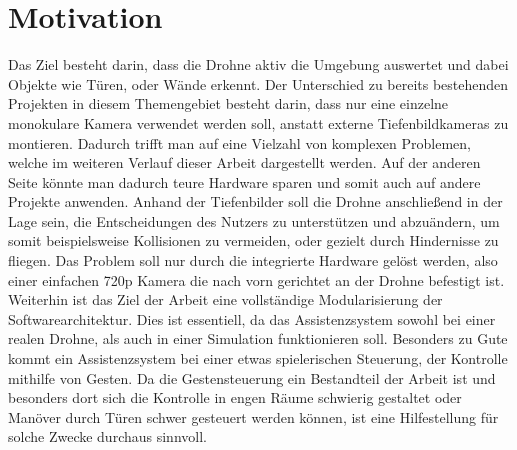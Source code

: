 \section{Motivation}
Das Ziel besteht darin, dass die Drohne aktiv die Umgebung auswertet und dabei Objekte wie Türen, oder Wände erkennt. Der Unterschied zu bereits bestehenden Projekten in diesem Themengebiet besteht darin, dass nur eine einzelne monokulare Kamera verwendet werden soll, anstatt externe Tiefenbildkameras zu montieren. \newline
Dadurch trifft man auf eine Vielzahl von komplexen Problemen, welche im weiteren Verlauf dieser Arbeit dargestellt werden. Auf der anderen Seite könnte man dadurch teure Hardware sparen und somit auch auf andere Projekte anwenden. \newline
Anhand der Tiefenbilder soll die Drohne anschließend in der Lage sein, die Entscheidungen des Nutzers zu unterstützen und abzuändern, um somit beispielsweise Kollisionen zu vermeiden, oder gezielt durch Hindernisse zu fliegen. \newline
Das Problem soll nur durch die integrierte Hardware gelöst werden, also einer einfachen 720p Kamera die nach vorn gerichtet an der Drohne befestigt ist. Weiterhin ist das Ziel der Arbeit eine vollständige Modularisierung der Softwarearchitektur. Dies ist essentiell, da das Assistenzsystem sowohl bei einer realen Drohne, als auch in einer Simulation funktionieren soll.\newline
Besonders zu Gute kommt ein Assistenzsystem bei einer etwas spielerischen Steuerung, der Kontrolle mithilfe von Gesten. Da die Gestensteuerung ein Bestandteil der Arbeit ist und besonders dort sich die Kontrolle in engen Räume schwierig gestaltet oder Manöver durch Türen schwer gesteuert werden können, ist eine Hilfestellung für solche Zwecke durchaus sinnvoll. 
